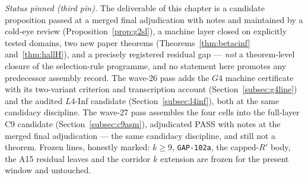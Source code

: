 
\emph{Status pinned (third pin).} The deliverable of this chapter is a candidate
proposition passed at a merged final adjudication with notes and maintained by a cold-eye
review (Proposition~\ref{prop:g2sl}), a machine layer closed on explicitly tested domains,
two new paper theorems (Theorems~\ref{thm:betacinf} and~\ref{thm:hallH}), and a precisely
registered residual gap
--- \emph{not} a theorem-level closure of the selection-rule programme, and no statement
here promotes any predecessor assembly record. The wave-26 pass adds the $G4$
machine certificate with its two-variant criterion and transcription account
(Section~\ref{subsec:g4line}) and the audited $L4$-Inf candidate
(Section~\ref{subsec:l4inf}), both at the same candidacy discipline. The
wave-27 pass assembles the four cells into the full-layer C9 candidate
(Section~\ref{subsec:c9asm}), adjudicated PASS with notes at the merged final
adjudication --- the same candidacy discipline, and still not a theorem.
Frozen lines, honestly marked:
$k\ge9$, \texttt{GAP-102a}, the capped-$R'$ body, the A15 residual leaves and the corridor
$k$ extension are frozen for the present window and untouched.

